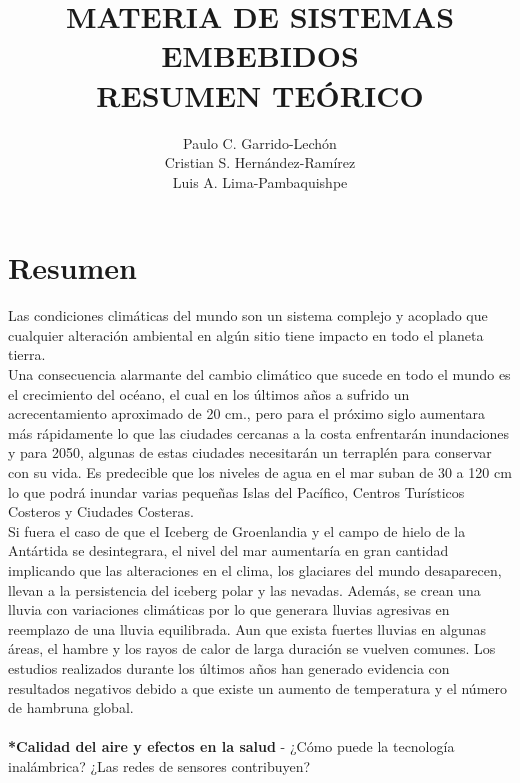 \documentclass[10pt,a4paper]{article}
\begin{document}
\author{Paulo C. Garrido-Lechón\\Cristian S. Hernández-Ramírez\\Luis A. Lima-Pambaquishpe} %
\title{MATERIA DE SISTEMAS EMBEBIDOS\\ %
RESUMEN TEÓRICO}
\maketitle  
\section{Resumen} %
\begin{multicols}{2} %

Las condiciones climáticas del mundo son un sistema complejo y acoplado que cualquier alteración ambiental en algún sitio tiene impacto en todo el planeta tierra.\\
Una consecuencia alarmante del cambio climático que sucede en todo el mundo es el crecimiento del océano, el cual en los últimos años a sufrido un acrecentamiento aproximado de 20 cm., pero para el próximo siglo aumentara más rápidamente lo que las ciudades cercanas a la costa enfrentarán inundaciones y para 2050, algunas de estas ciudades necesitarán un terraplén para conservar con su vida. Es predecible que los niveles de agua en el mar suban de 30 a 120 cm lo que podrá inundar varias pequeñas Islas del Pacífico, Centros Turísticos Costeros y Ciudades Costeras.\\
Si fuera el caso de que el Iceberg de Groenlandia y el campo de hielo de la Antártida se desintegrara, el nivel del mar aumentaría en gran cantidad implicando que las alteraciones en el clima, los glaciares del mundo desaparecen, llevan a la persistencia del iceberg polar y las nevadas. Además, se crean una lluvia con variaciones climáticas por lo que generara lluvias agresivas en reemplazo de una lluvia equilibrada. 
Aun que exista fuertes lluvias en algunas áreas, el hambre y los rayos de calor de larga duración se vuelven comunes. Los estudios realizados durante los últimos años han generado evidencia con resultados negativos debido a que existe un aumento de temperatura y el número de hambruna global. \\
\\
\textbf{*Calidad del aire y efectos en la salud} - ¿Cómo puede la tecnología inalámbrica? ¿Las redes de sensores contribuyen?\\

\end{multicols}
\end{document}
